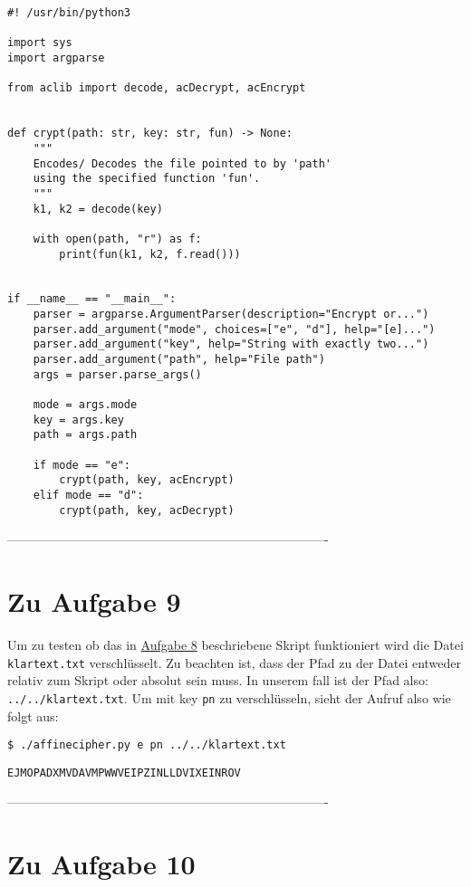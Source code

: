 \documentclass[12pt]{article}
\begin{document}
\begin{lstlisting}
#! /usr/bin/python3

import sys 
import argparse

from aclib import decode, acDecrypt, acEncrypt


def crypt(path: str, key: str, fun) -> None:
    """ 
    Encodes/ Decodes the file pointed to by 'path'
    using the specified function 'fun'.
    """
    k1, k2 = decode(key)

    with open(path, "r") as f:
        print(fun(k1, k2, f.read()))


if __name__ == "__main__":
    parser = argparse.ArgumentParser(description="Encrypt or...")
    parser.add_argument("mode", choices=["e", "d"], help="[e]...")
    parser.add_argument("key", help="String with exactly two...")
    parser.add_argument("path", help="File path")
    args = parser.parse_args()

    mode = args.mode
    key = args.key
    path = args.path
    
    if mode == "e":
        crypt(path, key, acEncrypt)
    elif mode == "d":
        crypt(path, key, acDecrypt)

\end{lstlisting}

%
 ----------------------------------------------------------------------------
\section{Zu Aufgabe 9}

Um zu testen ob das in \hyperref[sec:aufgabe_8]{Aufgabe 8} beschriebene Skript funktioniert wird die Datei \texttt{klartext.txt} verschlüsselt. Zu beachten ist, dass der Pfad zu der Datei entweder relativ zum Skript oder absolut sein muss. In unserem fall ist der Pfad also: \texttt{../../klartext.txt}. Um mit key \texttt{pn} zu verschlüsseln, sieht der Aufruf also wie folgt aus:

\begin{lstlisting}
$ ./affinecipher.py e pn ../../klartext.txt
\end{lstlisting}

\begin{lstlisting}
EJMOPADXMVDAVMPWWVEIPZINLLDVIXEINROV
\end{lstlisting}

%
 ----------------------------------------------------------------------------
\section{Zu Aufgabe 10}
\end{document}
